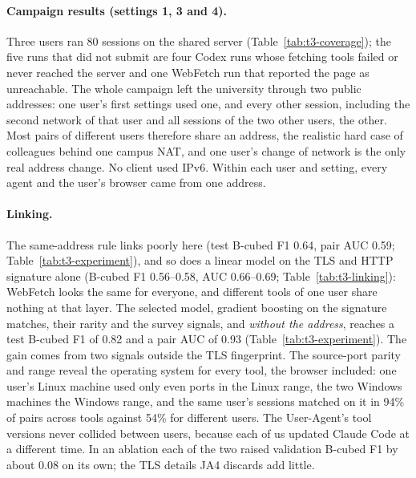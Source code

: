\paragraph{Campaign results (settings 1, 3 and 4).} Three users ran 80 sessions on the shared server
(Table~\ref{tab:t3-coverage}); the five runs that did not submit are four Codex runs whose fetching tools
failed or never reached the server and one WebFetch run that reported the page as unreachable. The whole campaign left the university through two public addresses: one user's first
settings used one, and every other session, including the second network of that user and all sessions of
the two other users, the other. Most pairs of different users therefore share an address, the realistic
hard case of colleagues behind one campus NAT, and one user's change of network is the only real address
change. No client used IPv6. Within each user and setting, every agent and the user's browser came from
one address.

\paragraph{Linking.} The same-address rule links poorly here (test B-cubed F1 0.64, pair AUC 0.59;
Table~\ref{tab:t3-experiment}), and so does a linear model on the TLS and HTTP signature alone (B-cubed
F1 0.56--0.58, AUC 0.66--0.69; Table~\ref{tab:t3-linking}): WebFetch looks the same for everyone, and
different tools of one user share nothing at that layer. The selected model, gradient boosting on the
signature matches, their rarity and the survey signals, and \emph{without the address}, reaches a test
B-cubed F1 of 0.82 and a pair AUC of 0.93 (Table~\ref{tab:t3-experiment}). The gain comes from two
signals outside the TLS fingerprint. The source-port parity and range reveal the operating system for
every tool, the browser included: one user's Linux machine used only even ports in the Linux range, the
two Windows machines the Windows range, and the same user's sessions matched on it in 94\% of pairs
across tools against 54\% for different users. The User-Agent's tool versions never collided between users,
because each of us updated Claude Code at a different time. In an ablation each of the two raised validation
B-cubed F1 by about 0.08 on its own; the TLS details JA4 discards add little.

